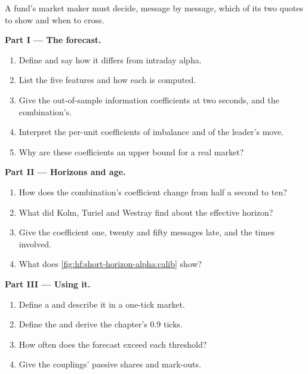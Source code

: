 \begin{problem}\label{pb:hf:short-horizon-alpha:1}
A fund's market maker must decide, message by message, which of its two quotes to show and when to cross.

\medskip\noindent\textbf{Part I --- The forecast.}
\begin{enumerate}
\item Define  and say how it differs from intraday alpha.
\item List the five features and how each is computed.
\item Give the out-of-sample information coefficients at two seconds, and the combination's.
\item Interpret the per-unit coefficients of imbalance and of the leader's move.
\item Why are these coefficients an upper bound for a real market?
\end{enumerate}

\medskip\noindent\textbf{Part II --- Horizons and age.}
\begin{enumerate}[resume]
\item How does the combination's coefficient change from half a second to ten?
\item What did Kolm, Turiel and Westray find about the effective horizon?
\item Give the coefficient one, twenty and fifty messages late, and the times involved.
\item What does \cref{fig:hf:short-horizon-alpha:calib} show?
\end{enumerate}

\medskip\noindent\textbf{Part III --- Using it.}
\begin{enumerate}[resume]
\item Define a  and describe it in a one-tick market.
\item Define the  and derive the chapter's 0.9 ticks.
\item How often does the forecast exceed each threshold?
\item Give the couplings' passive shares and mark-outs.
\end{enumerate}


\end{problem}
